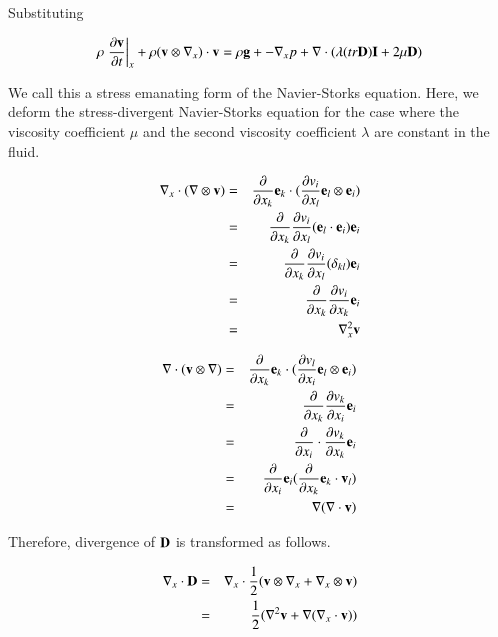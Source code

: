 Substituting

\begin{eqnarray}
\rho\left.\frac{\partial {\mathbf{v}}}{\partial t} \right|_x + \rho({\mathbf{v}} \otimes \nabla_x ) \cdot {\mathbf{v}}  =  \rho {\mathbf{g}}+-\nabla_x p+\nabla \cdot (\lambda(tr{\mathbf{D}}){\mathbf{I}}+2\mu{\mathbf{D}})
\end{eqnarray}

We call this a stress emanating form of the Navier-Storks equation. Here, we deform the stress-divergent Navier-Storks equation for the case where the viscosity coefficient $\mu$ and the second viscosity coefficient $\lambda$ are constant in the fluid.

\begin{eqnarray}
\nabla_x \cdot ( \nabla \otimes {\mathbf{v}} )
&=&  \frac{\partial}{\partial x_k}{\mathbf{e}}_k \cdot ( \frac{\partial v_i}{\partial x_l} {\mathbf{e}}_l \otimes {\mathbf{e}}_i ) \\
&=&  \frac{\partial}{\partial x_k}\frac{\partial v_i}{\partial x_l}( {\mathbf{e}}_l \cdot {\mathbf{e}}_i ){\mathbf{e}}_i \\
&=&  \frac{\partial}{\partial x_k}\frac{\partial v_i}{\partial x_l}( \delta_{kl} ){\mathbf{e}}_i  \\
&=&  \frac{\partial}{\partial x_k}\frac{\partial v_i}{\partial x_k}{\mathbf{e}}_i \\
&=&  \nabla_x^2 {\mathbf{v}}
\end{eqnarray}

\begin{eqnarray}
\nabla \cdot ( {\mathbf{v}} \otimes \nabla )
&=&  \frac{\partial}{\partial x_k}{\mathbf{e}}_k \cdot ( \frac{\partial v_l}{\partial x_i} {\mathbf{e}}_l \otimes {\mathbf{e}}_i )\\
&=&  \frac{\partial}{\partial x_k}\frac{\partial v_k}{\partial x_i}{\mathbf{e}}_i  \\
&=&  \frac{\partial}{\partial x_i} \cdot \frac{\partial v_k}{\partial x_k}{\mathbf{e}}_i \\
&=&  \frac{\partial}{\partial x_i}{\mathbf{e}}_i( \frac{\partial}{\partial x_k}{\mathbf{e}}_k \cdot {\mathbf{v}}_l ) \\
&=&  \nabla( \nabla \cdot {\mathbf{v}} )
\end{eqnarray}

Therefore, divergence of $\mathbf{D}$ is transformed as follows.

\begin{eqnarray}
\nabla_x \cdot {\mathbf{D}}
&=&  \nabla_x \cdot\frac{1}{2}({\mathbf{v}} \otimes \nabla_x+\nabla_x \otimes {\mathbf{v}}) \\
&=&  \frac{1}{2}( \nabla^2 {\mathbf{v}}+\nabla ( \nabla_x \cdot {\mathbf{v}} ) )
\end{eqnarray}

